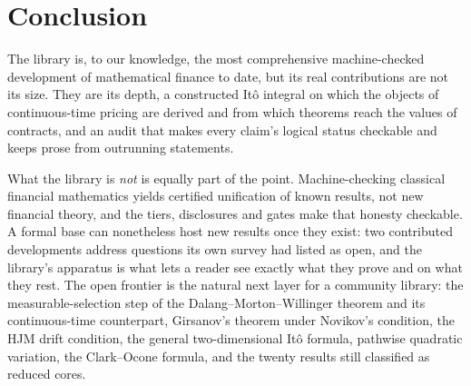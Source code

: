 \documentclass[11pt]{article}
\begin{document}
\section{Conclusion}\label{sec:conclusion}

The library is, to our knowledge, the most comprehensive machine-checked development of mathematical finance to date, but its real
contributions are not its size. They are its depth, a constructed It\^o integral on which the objects of continuous-time pricing are
derived and from which theorems reach the values of contracts, and an audit that makes every claim's logical status checkable and
keeps prose from outrunning statements.

What the library is \emph{not} is equally part of the point. Machine-checking classical financial mathematics yields certified
unification of known results, not new financial theory, and the tiers, disclosures and gates make that honesty checkable. A formal
base can nonetheless host new results once they exist: two contributed developments address questions its own survey had listed as
open, and the library's apparatus is what lets a reader see exactly what they prove and on what they rest. The open frontier is the
natural next layer for a community library: the measurable-selection step of the Dalang--Morton--Willinger theorem and its
continuous-time counterpart, Girsanov's theorem under Novikov's condition, the HJM drift condition, the general two-dimensional It\^o
formula, pathwise quadratic variation, the Clark--Ocone formula, and the twenty results still classified as reduced cores.
\end{document}
